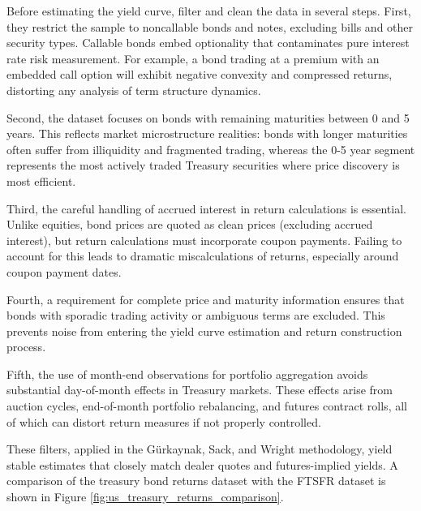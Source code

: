 \documentclass{article}
\begin{document}
\begin{appendices}
Before estimating the yield curve, \citet{Gurkaynak2007} filter and clean the data in several steps. First, they restrict the sample to noncallable bonds and notes, excluding bills and other security types. Callable bonds embed optionality that contaminates pure interest rate risk measurement. For example, a bond trading at a premium with an embedded call option will exhibit negative convexity and compressed returns, distorting any analysis of term structure dynamics.

Second, the dataset focuses on bonds with remaining maturities between 0 and 5 years. This reflects market microstructure realities: bonds with longer maturities often suffer from illiquidity and fragmented trading, whereas the 0-5 year segment represents the most actively traded Treasury securities where price discovery is most efficient.

Third, the careful handling of accrued interest in return calculations is essential. Unlike equities, bond prices are quoted as clean prices (excluding accrued interest), but return calculations must incorporate coupon payments. Failing to account for this leads to dramatic miscalculations of returns, especially around coupon payment dates.

Fourth, a requirement for complete price and maturity information ensures that bonds with sporadic trading activity or ambiguous terms are excluded. This prevents noise from entering the yield curve estimation and return construction process.

Fifth, the use of month-end observations for portfolio aggregation avoids substantial day-of-month effects in Treasury markets. These effects arise from auction cycles, end-of-month portfolio rebalancing, and futures contract rolls, all of which can distort return measures if not properly controlled.

These filters, applied in the Gürkaynak, Sack, and Wright methodology, yield stable estimates that closely match dealer quotes and futures-implied yields. A comparison of the treasury bond returns dataset with the FTSFR dataset is shown in Figure \ref{fig:us_treasury_returns_comparison}.


\end{appendices}
\end{document}
